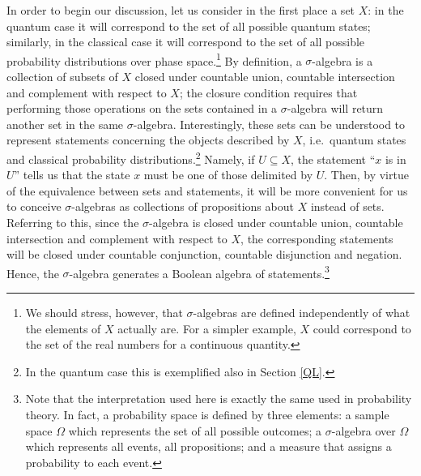 \documentclass[11pt, executivepaper]{article}
\begin{document}
In order to begin our discussion, let us consider in the first place a set $X$: in the quantum case it will correspond to the set of all possible quantum states; similarly, in the classical case it will correspond to the set of all possible probability distributions over phase space.\footnote{We should stress, however, that $\sigma$-algebras are defined independently of what the elements of $X$ actually are. For a simpler example, $X$  could correspond to the set of the real numbers for a continuous quantity.} By definition, a $\sigma$-algebra is a collection of subsets of $X$ closed under countable union, countable intersection and complement with respect to $X$; the closure condition requires that  performing those operations on the sets contained in a $\sigma$-algebra will return another set in the same $\sigma$-algebra. Interestingly, these sets can be understood to represent statements concerning the objects described by $X$, i.e.\ quantum states and classical probability distributions.\footnote{In the quantum case this is exemplified also in Section \ref{QL}.} Namely, if $U \subseteq X$, the statement ``$x$ is in $U$'' tells us that the state $x$ must be one of those delimited by $U$. Then, by virtue of the equivalence between sets and statements, it will be more convenient for us to conceive $\sigma$-algebras as collections of propositions about $X$ instead of sets. Referring to this, since the $\sigma$-algebra is closed under countable union, countable intersection and complement with respect to $X$, the corresponding statements will be closed under countable conjunction, countable disjunction and negation. Hence, the $\sigma$-algebra generates a Boolean algebra of statements.\footnote{Note that the interpretation used here is exactly the same used in probability theory. In fact, a probability space is defined by three elements: a sample space $\Omega$ which represents the set of all possible outcomes; a $\sigma$-algebra over $\Omega$ which represents all events, all propositions; and a measure that assigns a probability to each event.} 
\end{document}
